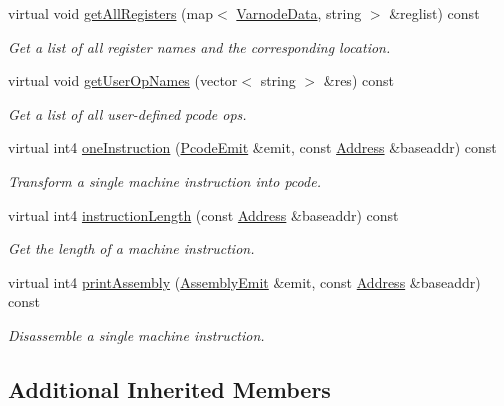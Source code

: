 \begin{DoxyCompactItemize}
virtual void \mbox{\hyperlink{class_ghidra_translate_af27964c522d8004ace3d7b6b661e2f60}{get\+All\+Registers}} (map$<$ \mbox{\hyperlink{struct_varnode_data}{Varnode\+Data}}, string $>$ \&reglist) const
\begin{DoxyCompactList}\small\item\em Get a list of all register names and the corresponding location. \end{DoxyCompactList}\item 
virtual void \mbox{\hyperlink{class_ghidra_translate_ac9f3a84c329f1432ebcc38be53b32495}{get\+User\+Op\+Names}} (vector$<$ string $>$ \&res) const
\begin{DoxyCompactList}\small\item\em Get a list of all {\itshape user-\/defined} pcode ops. \end{DoxyCompactList}\item 
virtual int4 \mbox{\hyperlink{class_ghidra_translate_aa78b3ea805b2fb69c7e4dc9e7d8f32ee}{one\+Instruction}} (\mbox{\hyperlink{class_pcode_emit}{Pcode\+Emit}} \&emit, const \mbox{\hyperlink{class_address}{Address}} \&baseaddr) const
\begin{DoxyCompactList}\small\item\em Transform a single machine instruction into pcode. \end{DoxyCompactList}\item 
virtual int4 \mbox{\hyperlink{class_ghidra_translate_a5935212f2ea8435a9df1b8e39020d04f}{instruction\+Length}} (const \mbox{\hyperlink{class_address}{Address}} \&baseaddr) const
\begin{DoxyCompactList}\small\item\em Get the length of a machine instruction. \end{DoxyCompactList}\item 
virtual int4 \mbox{\hyperlink{class_ghidra_translate_a363639d53835ddef0fcdbc22641ba685}{print\+Assembly}} (\mbox{\hyperlink{class_assembly_emit}{Assembly\+Emit}} \&emit, const \mbox{\hyperlink{class_address}{Address}} \&baseaddr) const
\begin{DoxyCompactList}\small\item\em Disassemble a single machine instruction. \end{DoxyCompactList}\end{DoxyCompactItemize}
\subsection*{Additional Inherited Members}


